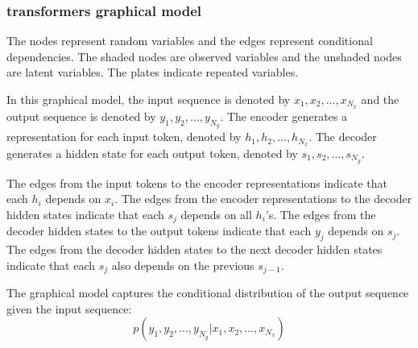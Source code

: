 \documentclass[USenglish,pdftex,compress,10pt,svgnamesi,handout]{beamer}
\begin{document}
\begin{frame}
\frametitle{transformers graphical model}

\footnotesize

The nodes represent random variables and the edges represent conditional dependencies. The shaded nodes are observed variables and the unshaded nodes are latent variables. The plates indicate repeated variables.

In this graphical model, the input sequence is denoted by $x_1, x_2, \dots, x_{N_x}$ and the output sequence is denoted by $y_1, y_2, \dots, y_{N_y}$. The encoder generates a representation for each input token, denoted by $h_1, h_2, \dots, h_{N_x}$. The decoder generates a hidden state for each output token, denoted by $s_1, s_2, \dots, s_{N_y}$.

The edges from the input tokens to the encoder representations indicate that each $h_i$ depends on $x_i$. The edges from the encoder representations to the decoder hidden states indicate that each $s_j$ depends on all $h_i$'s. The edges from the decoder hidden states to the output tokens indicate that each $y_j$ depends on $s_j$. The edges from the decoder hidden states to the next decoder hidden states indicate that each $s_j$ also depends on the previous $s_{j-1}$.

The graphical model captures the conditional distribution of the output sequence given the input sequence:
$$p(y_1, y_2, \dots, y_{N_y} | x_1, x_2, \dots, x_{N_x})$$
\end{frame}
\end{document}
